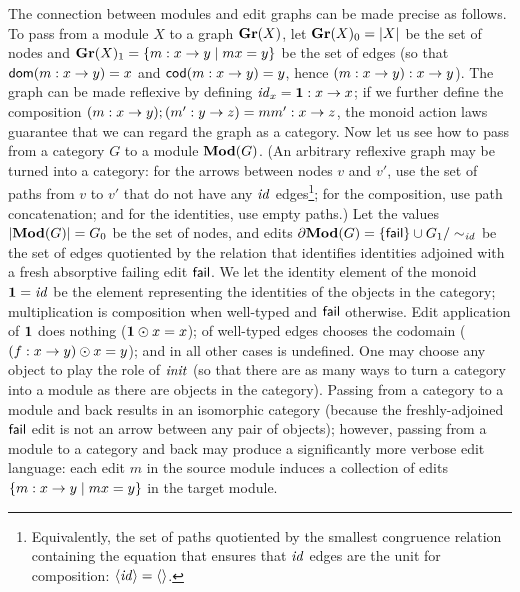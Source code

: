 The connection between modules and edit graphs can be made precise as
follows. To pass from a module $X$ to a graph $\mathbf{Gr}(X)$, let $\mathbf{Gr}(X)_0=|X|$
be the set of nodes and $\mathbf{Gr}(X)_1=\{m : x \to y \mid mx=y\}$ be the set
of edges (so that $\mathsf{dom}(m : x \to y)=x$ and $\mathsf{cod}(m : x \to y)=y$,
hence $(m : x \to y) : x \to y$). The graph can be made reflexive by
defining $\mathit{id}_x = \mbox{\bf{1}} : x \to x$; if we further define the composition
$(m : x \to y);(m' : y \to z)=mm' : x \to z$, the monoid action
laws guarantee that we can regard the graph as a category. Now let us see
how to pass from a category $G$ to a module $\mathbf{Mod}(G)$. (An arbitrary
reflexive graph may be turned into a category: for the arrows between nodes
$v$ and $v'$, use the set of paths from $v$ to $v'$ that do not have any
$\mathit{id}$ edges\footnote{Equivalently, the set of paths quotiented by the
smallest congruence relation containing the equation that ensures that $\mathit{id}$
edges are the unit for composition: $\left< \mathit{id} \right> = \left<\right>$.}; for the
composition, use path concatenation; and for the identities, use empty
paths.) Let the values $|\mathbf{Mod}(G)|=G_0$ be the set of nodes, and edits $\partial
\mathbf{Mod}(G)=\{\mathsf{fail}\}\cup G_1/\sim_{\mathit{id}}$ be the set of edges quotiented by the
relation that identifies identities adjoined with a fresh absorptive failing
edit $\mathsf{fail}$. We let the identity element of the monoid $\mbox{\bf{1}}=\mathit{id}$ be the
element representing the identities of the objects in the category;
multiplication is composition when well-typed and $\mathsf{fail}$ otherwise. Edit
application of $\mbox{\bf{1}}$ does nothing ($\mbox{\bf{1}}\odot x=x$); of well-typed edges
chooses the codomain ($(f : x \to y)\odot x=y$); and in all other cases
is undefined. One may choose any object to play the role of $\mathit{init}$ (so that
there are as many ways to turn a category into a module as there are objects
in the category). Passing from a category to a module and back results in an
isomorphic category (because the freshly-adjoined $\mathsf{fail}$ edit is not an
arrow between any pair of objects); however, passing from a module to a
category and back may produce a significantly more verbose edit language:
each edit $m$ in the source module induces a collection of edits $\{m : x
\to y \mid mx=y\}$ in the target module.

